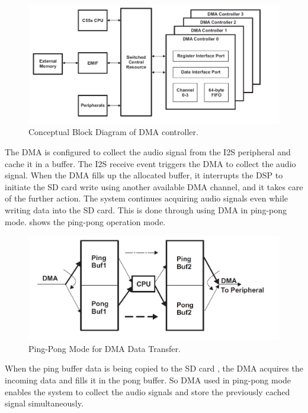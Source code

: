  \begin{figure}
 	\centering
 	\includegraphics[scale = 0.5 ]{DMA_overview}
\caption{Conceptual Block Diagram of DMA controller. \cite{dma}}
\label{DMA_Architecture}
 \end{figure} 


The DMA is configured to collect the audio signal from the I2S
peripheral and cache it in a buffer. The I2S receive event triggers
the DMA to collect the audio signal. When the DMA fills up the
allocated buffer, it interrupts the DSP to initiate the SD card write
using another available DMA channel, and it takes care of the further
action. The system continues acquiring audio signals even while
writing data into the SD card. This is done through using DMA in
ping-pong mode.  shows the ping-pong operation mode.
 
 \begin{figure}
 	\centering
 	\includegraphics[scale = 0.5 ]{ping_pong}
\caption{Ping-Pong Mode for DMA Data Transfer. \cite{dma}}
\label{ping_pong}
 \end{figure}

 When the ping buffer data is being copied to the SD card , the DMA acquires the incoming data and fills it in the pong buffer. So DMA used in ping-pong mode enables the system to collect the audio signals and store the previously cached signal simultaneously. 
 
